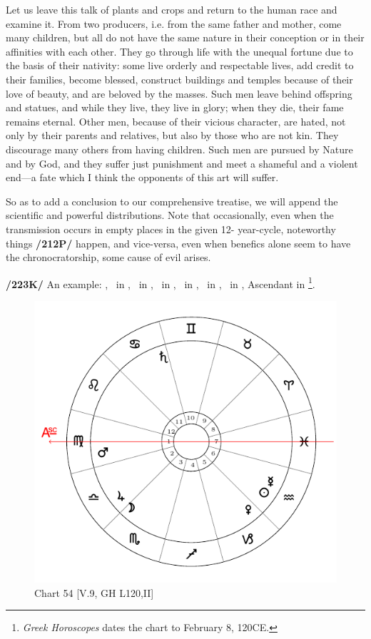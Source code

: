 Let us leave this talk of plants and crops and return to the human race and examine it. From two producers, i.e. from the same father and mother, come many children, but all do not have the same nature
in their conception or in their affinities with each other. They go through life with the unequal fortune due to the basis of their nativity: some live orderly and respectable lives, add credit to their families, become blessed, construct buildings and temples because of their love of beauty, and are beloved by the masses. Such men leave behind offspring and statues, and while they live, they live in glory; when they die, their fame remains eternal. Other men, because of their vicious character, are hated, not only by their parents and
relatives, but also by those who are not kin. They discourage many others from having children. Such men are pursued by Nature and by God, and they suffer just punishment and meet a shameful and a violent end—a fate which I think the opponents of this art will suffer.

So as to add a conclusion to our comprehensive treatise, we will append the scientific and powerful distributions. Note that occasionally, even when the transmission occurs in empty places in the given 12-
year-cycle, noteworthy things \textbf{/212P/} happen, and vice-versa, even when benefics alone seem to have the chronocratorship, some cause of evil arises.

\textbf{/223K/} An example: \Sun, \Mercury\, in \Aquarius, \Moon\, in \Scorpio, \Saturn\, in \Cancer, \Jupiter\, in \Libra, \Mars\, in \Virgo, \Venus\, in \Capricorn, Ascendant in \Virgo\footnote{\textit{Greek Horoscopes} dates the chart to February 8, 120CE.}. 

\begin{figure}
\centering
\vspace{-20pt}
\includegraphics[width=.68\textwidth]{charts/5_09_1}
\caption{Chart 54 [V.9, GH L120,II]}
\label{fig:chart54}
\end{figure}

